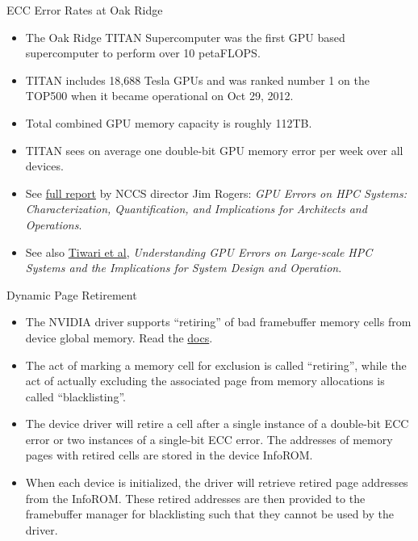 \documentclass[handout]{beamer}
\begin{document}
\begin{frame}{ECC Error Rates at Oak Ridge}
\begin{itemize}
	\item<1->The Oak Ridge TITAN Supercomputer was the first GPU based supercomputer to perform over 10 petaFLOPS.
	\item<1->TITAN includes 18,688 Tesla GPUs and was ranked number 1 on the TOP500 when it became operational on Oct 29, 2012. 
	\item<1->Total combined GPU memory capacity is roughly 112TB.
	\item<1->TITAN sees on average one double-bit GPU memory error per week over all devices.
	\item<1->See \href{http://on-demand.gputechconf.com/gtc/2015/presentation/S5566-James-Rogers.pdf}{\color{blue}full report} by NCCS director Jim Rogers: \emph{GPU Errors on HPC Systems: Characterization, Quantification, and Implications for Architects and Operations}. 
	\item<1->See also \href{http://www4.ncsu.edu/~dtiwari2/Papers/2015_HPCA_Tiwari_GPU_Reliability.pdf}{\color{blue}Tiwari et al}, \emph{Understanding GPU Errors on Large-scale HPC Systems and the Implications for System Design and Operation}.
\end{itemize}
\end{frame}

\begin{frame}{Dynamic Page Retirement}
\begin{itemize}
	\item<1->The NVIDIA driver supports ``retiring'' of bad framebuffer memory cells from device global memory.  Read the \href{http://docs.nvidia.com/deploy/dynamic-page-retirement/index.html}{\color{blue}docs}.
	\item<1->The act of marking a memory cell for exclusion is called ``retiring'', while the act of actually excluding the associated page from memory allocations is called ``blacklisting''.
	\item<1->The device driver will retire a cell after a single instance of a double-bit ECC error or two instances of a single-bit ECC error. The addresses of memory pages with retired cells are stored in the device InfoROM.
	\item<1->When each device is initialized, the driver will retrieve retired page addresses from the InfoROM.  These retired addresses are then provided to the framebuffer manager for blacklisting such that they cannot be used by the driver.
	
\end{itemize}
\end{frame}
\end{document}
